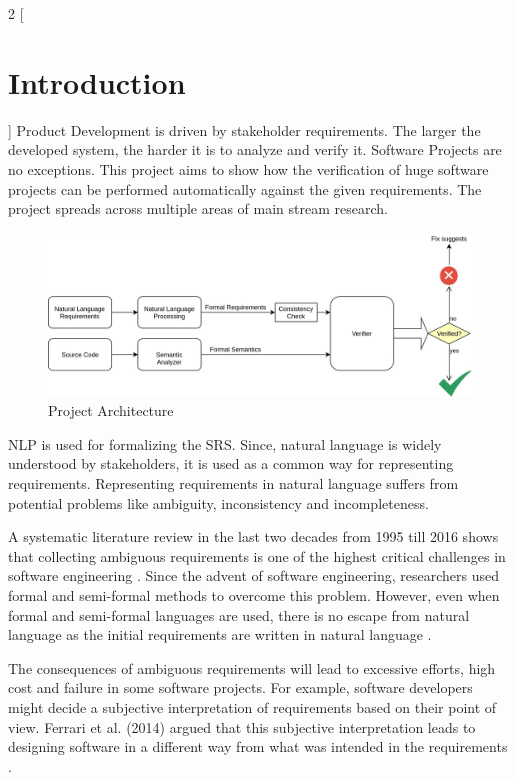 \begin{multicols*}{2}
	[\section{Introduction}]
	Product Development is driven by stakeholder requirements. The larger the developed system, the harder it is to analyze and verify it. Software Projects are no exceptions. This project aims to show how the verification of huge software projects can be performed automatically against the given requirements. The project spreads across multiple areas of main stream research.
	
	\begin{figure}[H]
		\centering
		\includegraphics[width=1\linewidth]{../Architecture}
		\caption[PorjArch]{Project Architecture}
		\label{fig:architecture}
	\end{figure}
	
	\gls{NLP} is used for formalizing the \gls{SRS}. Since, natural language is widely understood by stakeholders, it is used as a common way for representing requirements. Representing requirements in natural language suffers from potential problems like ambiguity, inconsistency and incompleteness.
	
	A systematic literature review in the last two decades from 1995 till 2016 shows that collecting ambiguous requirements is one of the highest critical challenges in software engineering \cite{Besrour}. Since the advent of software engineering, researchers used formal and semi-formal methods to overcome this problem. However, even when formal and semi-formal languages are used, there is no escape from natural language as the initial requirements are written in natural language \cite{Kamsties}.
	
	The consequences of ambiguous requirements will lead to excessive efforts, high cost and failure in some software projects. For example, software developers might decide a subjective interpretation of requirements based on their point of view. Ferrari et al. (2014) argued that this subjective interpretation leads to designing software in a different way from what was intended in the requirements \cite{Ferrari}.
	

\end{multicols*}
